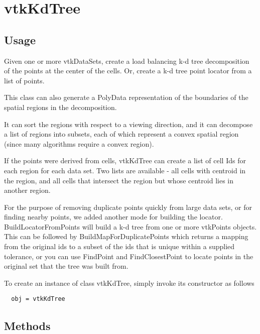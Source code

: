 \section{vtkKdTree}

\subsection{Usage}

     Given one or more vtkDataSets, create a load balancing
     k-d tree decomposition of the points at the center of the cells.
     Or, create a k-d tree point locator from a list of points.

     This class can also generate a PolyData representation of
     the boundaries of the spatial regions in the decomposition.

     It can sort the regions with respect to a viewing direction,
     and it can decompose a list of regions into subsets, each
     of which represent a convex spatial region (since many algorithms
     require a convex region).  

     If the points were derived from cells, vtkKdTree
     can create a list of cell Ids for each region for each data set.  
     Two lists are available - all cells with centroid in the region, 
     and all cells that intersect the region but whose centroid lies 
     in another region.

     For the purpose of removing duplicate points quickly from large
     data sets, or for finding nearby points, we added another mode for 
     building the locator.  BuildLocatorFromPoints will build a k-d tree
     from one or more vtkPoints objects.  This can be followed by
     BuildMapForDuplicatePoints which returns a mapping from the original
     ids to a subset of the ids that is unique within a supplied
     tolerance, or you can use FindPoint and FindClosestPoint to
     locate points in the original set that the tree was built from.


To create an instance of class vtkKdTree, simply
invoke its constructor as follows
\begin{verbatim}
  obj = vtkKdTree
\end{verbatim}
\subsection{Methods}

